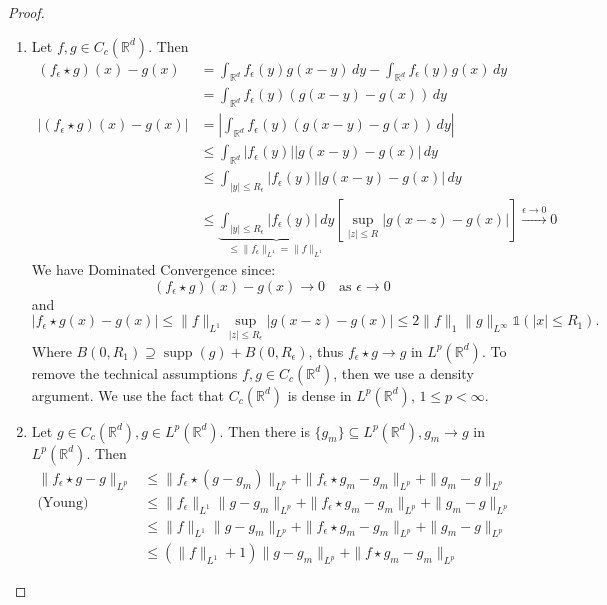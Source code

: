 \documentclass{report}
\theoremstyle{tommy}
\newcommand{\supp}{\operatorname{supp}}
\begin{document}
  \begin{proof}\
    \begin{enumerate}[label=Step \arabic*:]
      \item Let \(f, g \in C_c(\mathbb{R}^d)\). Then
      \begin{align*}
        (f_\epsilon \star g)(x) - g(x) 
        &= \int_{\mathbb{R}^d} f_\epsilon(y) g(x-y) \, dy - \int_{\mathbb{R}^d} f_\epsilon(y) g(x) \, dy \\
        &= \int_{\mathbb{R}^d} f_\epsilon(y) (g(x-y) - g(x)) \, dy \\
        |(f_\epsilon \star g)(x) - g(x)| 
        &= \left| \int_{\mathbb{R}^d} f_\epsilon(y) (g(x-y) - g(x)) \, dy \right| \\
        &\le \int_{\mathbb{R}^d} |f_\epsilon(y)| |g(x-y) - g(x)| \, dy \\
        &\le \int_{|y| \le R_\epsilon} |f_\epsilon(y)||g(x-y) - g(x)| \, dy \\
        &\le \underbrace{\int_{|y| \le R_\epsilon} |f_\epsilon(y)| \, dy}_{\le \|f_\epsilon\|_{L^1} = \|f\|_{L^1}} \left[\sup_{|z| \le R} |g(x-z) - g(x)| \right] 
        \xrightarrow{\epsilon \to 0} 0
      \end{align*}
      We have Dominated Convergence since:
      \[(f_\epsilon \star g)(x) - g(x) \to 0 \quad \text{as } \epsilon \to 0\]
      and
      \[|f_\epsilon \star g(x) - g(x)| \le \|f\|_{L^1} \sup_{|z| \le R_\epsilon} |g(x-z) - g(x)| \le 2 \|f\|_1 \|g\|_{L^\infty} \mathbb{1}(|x| \le R_1).\]
      Where \(B(0, R_1) \supseteq \supp(g) + B(0, R_\epsilon)\), thus
      \(f_\epsilon \star g \to g\) in \(L^p(\mathbb{R}^d)\). To remove the technical assumptions \(f, g \in C_c(\mathbb{R}^d)\), then we use a density argument. We use the fact that \(C_c(\mathbb{R}^d)\) is dense in \(L^p(\mathbb{R}^d)\), \(1 \le p < \infty\).
      \item Let \(g \in C_c(\mathbb{R}^d), g \in L^p(\mathbb{R}^d)\). Then there is \(\{g_m\} \subseteq L^p(\mathbb{R}^d), g_m \to g\) in \(L^p(\mathbb{R}^d)\). Then 
      \begin{align*}
        \|f_\epsilon \star g - g\|_{L^p} 
        &\le \|f_\epsilon \star (g - g_m)\|_{L^p}  + \|f_\epsilon \star g_m - g_m \|_{L^p}+ \|g_m - g\|_{L^p} \\
        \text{(Young)} \quad &\le \|f_\epsilon\|_{L^1}\|g-g_m\|_{L^p}  + \|f_\epsilon \star g_m - g_m \|_{L^p}+ \|g_m - g\|_{L^p} \\
        &\le \|f\|_{L^1}\|g-g_m\|_{L^p}  + \|f_\epsilon \star g_m - g_m \|_{L^p}+ \|g_m - g\|_{L^p} \\
        &\le (\|f\|_{L^1} + 1) \|g - g_m\|_{L^p} + \|f \star g_m - g_m\|_{L^p}
      \end{align*}
      

\end{enumerate}
\end{proof}
\end{document}
